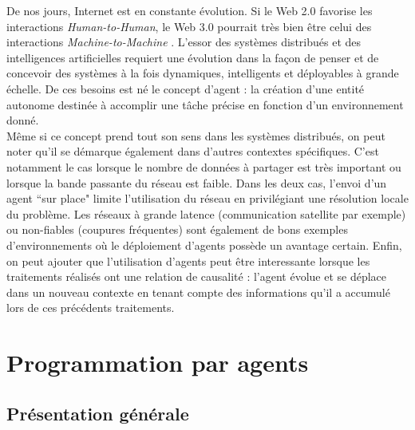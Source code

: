 \documentclass[conference]{IEEEtran}
\begin{document}
De nos jours, Internet est en constante évolution. Si le Web 2.0 favorise les interactions \textit{Human-to-Human}, le Web 3.0 pourrait très bien être celui des interactions \textit{Machine-to-Machine} \cite{boissier}. L'essor des systèmes distribués et des intelligences artificielles requiert une évolution dans la façon de penser et de concevoir des systèmes à la fois dynamiques, intelligents et déployables à grande échelle. De ces besoins est né le concept d'agent : la création d'une entité autonome destinée à accomplir une tâche précise en fonction d'un environnement donné.\\

Même si ce concept prend tout son sens dans les systèmes distribués, on peut noter qu'il se démarque également dans d'autres contextes spécifiques. C'est notamment le cas lorsque le nombre de données à partager est très important ou lorsque la bande passante du réseau est faible. Dans les deux cas, l'envoi d'un agent ``sur place" limite l'utilisation du réseau en privilégiant une résolution locale du problème. Les réseaux à grande latence (communication satellite par exemple) ou non-fiables (coupures fréquentes) sont également de bons exemples d'environnements où le déploiement d'agents possède un avantage certain. Enfin, on peut ajouter que l'utilisation d'agents peut être interessante lorsque les traitements réalisés ont une relation de causalité : l'agent évolue et se déplace dans un nouveau contexte en tenant compte des informations qu'il a accumulé lors de ces précédents traitements.\\

\section{Programmation par agents}
\vspace*{1mm}

\subsection{Présentation générale}
\vspace*{1mm}
\end{document}
